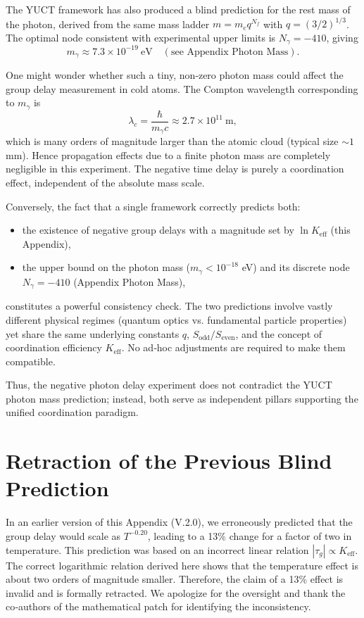 \documentclass[12pt,a4paper]{article}
\newcommand{\Keff}{K_{\mathrm{eff}}}
\begin{document}
The YUCT framework has also produced a blind prediction for the rest mass of the photon, derived from the same mass ladder $m = m_e q^{N_f}$ with $q=(3/2)^{1/3}$. The optimal node consistent with experimental upper limits is $N_\gamma = -410$, giving
\[
m_\gamma \approx 7.3 \times 10^{-19}~\text{eV} \quad (\text{see Appendix Photon Mass}).
\]

One might wonder whether such a tiny, non‑zero photon mass could affect the group delay measurement in cold atoms. The Compton wavelength corresponding to $m_\gamma$ is
\[
\lambda_c = \frac{\hbar}{m_\gamma c} \approx 2.7\times10^{11}~\text{m},
\]
which is many orders of magnitude larger than the atomic cloud (typical size $\sim 1$ mm). Hence propagation effects due to a finite photon mass are completely negligible in this experiment. The negative time delay is purely a coordination effect, independent of the absolute mass scale.

Conversely, the fact that a single framework correctly predicts both:
\begin{itemize}
	\item the existence of negative group delays with a magnitude set by $\ln\Keff$ (this Appendix),
	\item the upper bound on the photon mass ($m_\gamma < 10^{-18}$ eV) and its discrete node $N_\gamma = -410$ (Appendix Photon Mass),
\end{itemize}
constitutes a powerful consistency check. The two predictions involve vastly different physical regimes (quantum optics vs. fundamental particle properties) yet share the same underlying constants $q$, $S_{\mathrm{odd}}/S_{\mathrm{even}}$, and the concept of coordination efficiency $\Keff$. No ad‑hoc adjustments are required to make them compatible.

Thus, the negative photon delay experiment does not contradict the YUCT photon mass prediction; instead, both serve as independent pillars supporting the unified coordination paradigm.

	\section{Retraction of the Previous Blind Prediction}
	
	In an earlier version of this Appendix (V.2.0), we erroneously predicted that the group delay would scale as \(T^{-0.20}\), leading to a 13\% change for a factor of two in temperature. This prediction was based on an incorrect linear relation \(|\tau_g| \propto \Keff\). The correct logarithmic relation derived here shows that the temperature effect is about two orders of magnitude smaller. Therefore, the claim of a 13\% effect is invalid and is formally retracted. We apologize for the oversight and thank the co‑authors of the mathematical patch for identifying the inconsistency.
	
\end{document}
